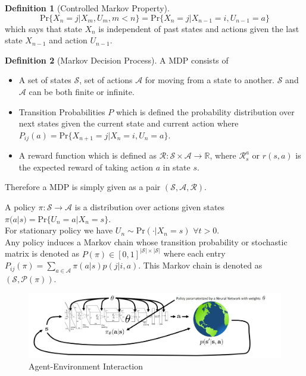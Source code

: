 \documentclass{article}
\theoremstyle{definition}
\newtheorem{definition}{Definition}[section]
\begin{document}
\begin{definition}[Controlled Markov Property]
\[\text{Pr}\{X_n=j|X_m,U_m,m< n\} = \text{Pr}\{X_n=j|X_{n-1}=i,U_{n-1}=a\}\]
which says that state $X_n$ is independent of past states and actions given the last state $X_{n-1}$ and action $U_{n-1}$.
\end{definition}
\begin{definition}[Markov Decision Process]
A MDP consists of 
\begin{itemize}
    \item A set of states $\mathcal{S}$, set of actions $\mathcal{A}$ for moving from a state to another. $\mathcal{S}$ and $\mathcal{A}$ can be both finite or infinite.
    \item Transition Probabilities $P$ which is defined the probability distribution over next states given the current state and current action where $P_{ij}(a) = \text{Pr}\{X_{n+1}=j|X_{n}=i,U_n=a\}$.
    \item A reward function which is defined as $\mathcal{R}: \mathcal{S}\times\mathcal{A}\rightarrow\mathbb{R}$, where $\mathcal{R}_s^a$ or $r(s,a)$ is the expected reward of taking action $a$ in state $s$.
\end{itemize} 

Therefore a MDP is simply given as a pair $(\mathcal{S},\mathcal{A},\mathcal{R})$.\\
\end{definition}
A policy $\pi:\mathcal{S}\rightarrow\mathcal{A}$ is a distribution over actions given states $\pi(a|s) = \text{Pr}\{U_n=a|X_n=s\}$. \\For stationary policy we have $U_n\sim \text{Pr}(\cdot|X_n=s)$ $\forall t>0$.\\
Any policy induces a Markov chain whose transition probability or stochastic matrix is denoted as $P(\pi) \in [0,1]^{|\mathcal{S}|\times|\mathcal{S}|}$  where each entry $P_{ij}(\pi) = \sum_{a\in\mathcal{A}}\pi(a|s)p(j|i,a)$. This Markov chain is denoted as $(\mathcal{S},\mathcal{P}(\pi))$.\\

\begin{figure}[H]
    \centering
    \includegraphics[width=15cm]{images/rl.jpeg}
    \caption{Agent-Environment Interaction \cite{sergey}}
    \label{fig:my_label}
\end{figure}
\end{document}
